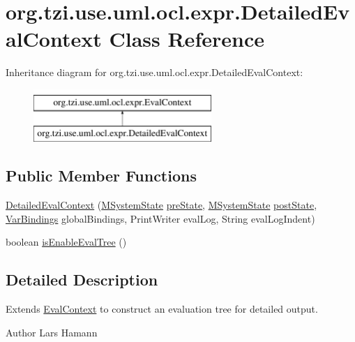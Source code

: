 \hypertarget{classorg_1_1tzi_1_1use_1_1uml_1_1ocl_1_1expr_1_1_detailed_eval_context}{\section{org.\-tzi.\-use.\-uml.\-ocl.\-expr.\-Detailed\-Eval\-Context Class Reference}
\label{classorg_1_1tzi_1_1use_1_1uml_1_1ocl_1_1expr_1_1_detailed_eval_context}
}
Inheritance diagram for org.\-tzi.\-use.\-uml.\-ocl.\-expr.\-Detailed\-Eval\-Context\-:\begin{figure}[H]
\begin{center}
\leavevmode
\includegraphics[height=2.000000cm]{classorg_1_1tzi_1_1use_1_1uml_1_1ocl_1_1expr_1_1_detailed_eval_context}
\end{center}
\end{figure}
\subsection*{Public Member Functions}
\begin{DoxyCompactItemize}
\item 
\hyperlink{classorg_1_1tzi_1_1use_1_1uml_1_1ocl_1_1expr_1_1_detailed_eval_context_a795eaab52137279de03c68030704f8cc}{Detailed\-Eval\-Context} (\hyperlink{classorg_1_1tzi_1_1use_1_1uml_1_1sys_1_1_m_system_state}{M\-System\-State} \hyperlink{classorg_1_1tzi_1_1use_1_1uml_1_1ocl_1_1expr_1_1_eval_context_a6fb38133d57ae3d04bd314c3021b7f10}{pre\-State}, \hyperlink{classorg_1_1tzi_1_1use_1_1uml_1_1sys_1_1_m_system_state}{M\-System\-State} \hyperlink{classorg_1_1tzi_1_1use_1_1uml_1_1ocl_1_1expr_1_1_eval_context_ac2aea50bc5b2d92d095ca6bd1f6207f5}{post\-State}, \hyperlink{classorg_1_1tzi_1_1use_1_1uml_1_1ocl_1_1value_1_1_var_bindings}{Var\-Bindings} global\-Bindings, Print\-Writer eval\-Log, String eval\-Log\-Indent)
\item 
boolean \hyperlink{classorg_1_1tzi_1_1use_1_1uml_1_1ocl_1_1expr_1_1_detailed_eval_context_a11f217af85e7d19a6f263be99971e568}{is\-Enable\-Eval\-Tree} ()
\end{DoxyCompactItemize}


\subsection{Detailed Description}
Extends \hyperlink{classorg_1_1tzi_1_1use_1_1uml_1_1ocl_1_1expr_1_1_eval_context}{Eval\-Context} to construct an evaluation tree for detailed output. \begin{DoxyAuthor}{Author}
Lars Hamann 
\end{DoxyAuthor}


